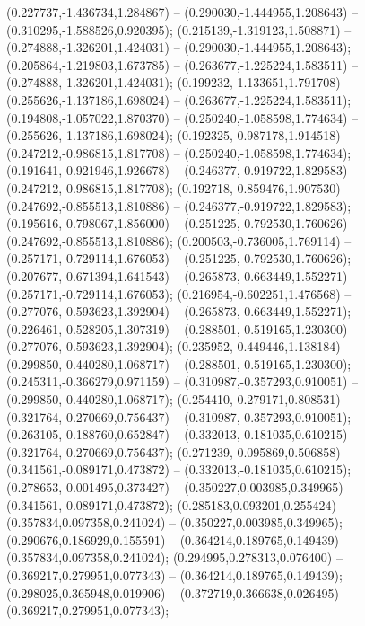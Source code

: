  (0.227737,-1.436734,1.284867) -- (0.290030,-1.444955,1.208643) -- (0.310295,-1.588526,0.920395);
 (0.215139,-1.319123,1.508871) -- (0.274888,-1.326201,1.424031) -- (0.290030,-1.444955,1.208643);
 (0.205864,-1.219803,1.673785) -- (0.263677,-1.225224,1.583511) -- (0.274888,-1.326201,1.424031);
 (0.199232,-1.133651,1.791708) -- (0.255626,-1.137186,1.698024) -- (0.263677,-1.225224,1.583511);
 (0.194808,-1.057022,1.870370) -- (0.250240,-1.058598,1.774634) -- (0.255626,-1.137186,1.698024);
 (0.192325,-0.987178,1.914518) -- (0.247212,-0.986815,1.817708) -- (0.250240,-1.058598,1.774634);
 (0.191641,-0.921946,1.926678) -- (0.246377,-0.919722,1.829583) -- (0.247212,-0.986815,1.817708);
 (0.192718,-0.859476,1.907530) -- (0.247692,-0.855513,1.810886) -- (0.246377,-0.919722,1.829583);
 (0.195616,-0.798067,1.856000) -- (0.251225,-0.792530,1.760626) -- (0.247692,-0.855513,1.810886);
 (0.200503,-0.736005,1.769114) -- (0.257171,-0.729114,1.676053) -- (0.251225,-0.792530,1.760626);
 (0.207677,-0.671394,1.641543) -- (0.265873,-0.663449,1.552271) -- (0.257171,-0.729114,1.676053);
 (0.216954,-0.602251,1.476568) -- (0.277076,-0.593623,1.392904) -- (0.265873,-0.663449,1.552271);
 (0.226461,-0.528205,1.307319) -- (0.288501,-0.519165,1.230300) -- (0.277076,-0.593623,1.392904);
 (0.235952,-0.449446,1.138184) -- (0.299850,-0.440280,1.068717) -- (0.288501,-0.519165,1.230300);
 (0.245311,-0.366279,0.971159) -- (0.310987,-0.357293,0.910051) -- (0.299850,-0.440280,1.068717);
 (0.254410,-0.279171,0.808531) -- (0.321764,-0.270669,0.756437) -- (0.310987,-0.357293,0.910051);
 (0.263105,-0.188760,0.652847) -- (0.332013,-0.181035,0.610215) -- (0.321764,-0.270669,0.756437);
 (0.271239,-0.095869,0.506858) -- (0.341561,-0.089171,0.473872) -- (0.332013,-0.181035,0.610215);
 (0.278653,-0.001495,0.373427) -- (0.350227,0.003985,0.349965) -- (0.341561,-0.089171,0.473872);
 (0.285183,0.093201,0.255424) -- (0.357834,0.097358,0.241024) -- (0.350227,0.003985,0.349965);
 (0.290676,0.186929,0.155591) -- (0.364214,0.189765,0.149439) -- (0.357834,0.097358,0.241024);
 (0.294995,0.278313,0.076400) -- (0.369217,0.279951,0.077343) -- (0.364214,0.189765,0.149439);
 (0.298025,0.365948,0.019906) -- (0.372719,0.366638,0.026495) -- (0.369217,0.279951,0.077343);
